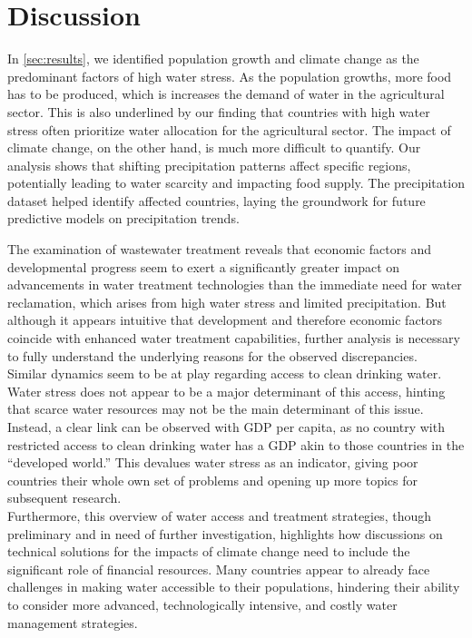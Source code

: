 \documentclass{article}
\theoremstyle{plain}
\theoremstyle{definition}
\theoremstyle{remark}
\begin{document}



\section{Discussion}
In \autoref{sec:results}, we identified population growth and climate change as the predominant factors of high water stress. As the population growths, more food has to be produced, which is increases the demand of water in the agricultural sector. This is also underlined by our finding that countries with high water stress often prioritize water allocation for the agricultural sector. The impact of climate change, on the other hand, is much more difficult to quantify. Our analysis shows that shifting precipitation patterns affect specific regions, potentially leading to water scarcity and impacting food supply. The precipitation dataset helped identify affected countries, laying the groundwork for future predictive models on precipitation trends.

The examination of wastewater treatment reveals that economic factors and developmental progress seem to exert a significantly greater impact on advancements in water treatment technologies than the immediate need for water reclamation, which arises from high water stress and limited precipitation. But although it appears intuitive that development and therefore economic factors coincide with enhanced water treatment capabilities, further analysis is necessary to fully understand the underlying reasons for the observed discrepancies.\\
Similar dynamics seem to be at play regarding access to clean drinking water. Water stress does not appear to be a major determinant of this access, hinting that scarce water resources may not be the main determinant of this issue. Instead, a clear link can be observed with GDP per capita, as no country with restricted access to clean drinking water has a GDP akin to those countries in the “developed world.” This devalues water stress as an indicator, giving poor countries their whole own set of problems and opening up more topics for subsequent research.\\
Furthermore, this overview of water access and treatment strategies, though preliminary and in need of further investigation, highlights how discussions on technical solutions for the impacts of climate change need to include the significant role of financial resources. Many countries appear to already face challenges in making water accessible to their populations, hindering their ability to consider more advanced, technologically intensive, and costly water management strategies.
\end{document}
